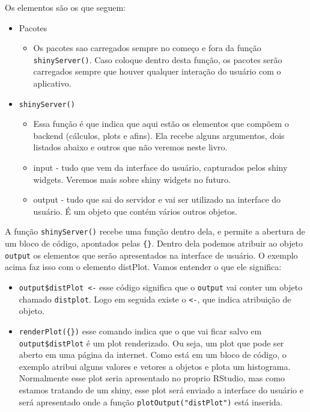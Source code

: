 \documentclass[
]{book}
\providecommand{\tightlist}{%
  \setlength{\itemsep}{0pt}\setlength{\parskip}{0pt}}
\begin{document}
Os elementos são os que seguem:

\begin{itemize}
\tightlist
\item
  Pacotes

  \begin{itemize}
  \tightlist
  \item
    Os pacotes sao carregados sempre no começo e fora da função \texttt{shinyServer()}. Caso coloque dentro desta função, os pacotes serão carregados sempre que houver qualquer interação do usuário com o aplicativo.
  \end{itemize}
\item
  \texttt{shinyServer()}

  \begin{itemize}
  \tightlist
  \item
    Essa função é que indica que aqui estão os elementos que compõem o backend (cálculos, plots e afins). Ela recebe alguns argumentos, dois listados abaixo e outros que não veremos neste livro.
  \item
    input - tudo que vem da interface do usuário, capturados pelos shiny widgets. Veremos mais sobre shiny widgets no futuro.
  \item
    output - tudo que sai do servidor e vai ser utilizado na interface do usuário. É um objeto que contém vários outros objetos.
  \end{itemize}
\end{itemize}

A função \texttt{shinyServer()} recebe uma função dentro dela, e permite a abertura de um bloco de código, apontados pelas \texttt{\{\}}. Dentro dela podemos atribuir ao objeto \texttt{output} os elementos que serão apresentados na interface de usuário. O exemplo acima faz isso com o elemento distPlot. Vamos entender o que ele significa:

\begin{itemize}
\tightlist
\item
  \texttt{output\$distPlot\ \textless{}-} esse código significa que o \texttt{output} vai conter um objeto chamado \texttt{distplot}. Logo em seguida existe o \texttt{\textless{}-}, que indica atribuição de objeto.
\item
  \texttt{renderPlot(\{\})} esse comando indica que o que vai ficar salvo em \texttt{output\$distPlot} é um plot renderizado. Ou seja, um plot que pode ser aberto em uma página da internet. Como está em um bloco de código, o exemplo atribui alguns valores e vetores a objetos e plota um histograma. Normalmente esse plot seria apresentado no proprio RStudio, mas como estamos tratando de um shiny, esse plot será enviado a interface do usuário e será apresentado onde a função \texttt{plotOutput("distPlot")} está inserida.
\end{itemize}
\end{document}
